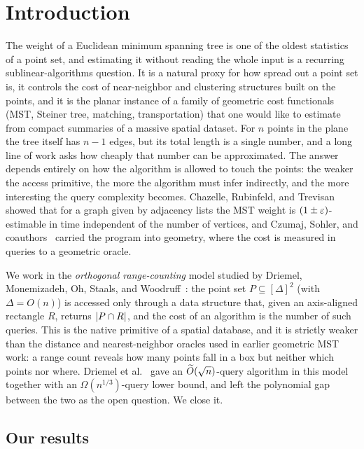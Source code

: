 \section{Introduction}\label{sec:intro}

The weight of a Euclidean minimum spanning tree is one of the oldest statistics of a point set, and
estimating it without reading the whole input is a recurring sublinear-algorithms question. It is a
natural proxy for how spread out a point set is, it controls the cost of near-neighbor and clustering
structures built on the points, and it is the planar instance of a family of geometric cost functionals
(MST, Steiner tree, matching, transportation) that one would like to estimate from compact summaries of a
massive spatial dataset. For $n$ points in the plane the tree itself has $n-1$ edges, but its total length
is a single number, and a long line of work asks how cheaply that number can be approximated. The answer
depends entirely on how the algorithm is allowed to touch the points: the weaker the access primitive, the
more the algorithm must infer indirectly, and the more interesting the query complexity becomes. Chazelle, Rubinfeld, and Trevisan~\cite{CRT05} showed that for a graph given
by adjacency lists the MST weight is $(1\pm\varepsilon)$-estimable in time independent of the number of vertices,
and Czumaj, Sohler, and coauthors~\cite{Czumaj05,CzumajSohler09} carried the program into geometry, where
the cost is measured in queries to a geometric oracle.

We work in the \emph{orthogonal range-counting} model studied by Driemel, Monemizadeh, Oh, Staals, and
Woodruff~\cite{DMOSW25}: the point set $P\subseteq[\Delta]^2$ (with $\Delta=O(n)$) is accessed only
through a data structure that, given an axis-aligned rectangle $R$, returns $\left|P\cap R\right|$, and the cost
of an algorithm is the number of such queries. This is the native primitive of a spatial database, and it
is strictly weaker than the distance and nearest-neighbor oracles used in earlier geometric MST work: a
range count reveals how many points fall in a box but neither which points nor where. Driemel et
al.~\cite{DMOSW25} gave an $\widetilde{O}(\sqrt n)$-query algorithm in this model together with an
$\Omega(n^{1/3})$-query lower bound, and left the polynomial gap between the two as the open question. We
close it.

\subsection{Our results}\label{sec:intro-results}


